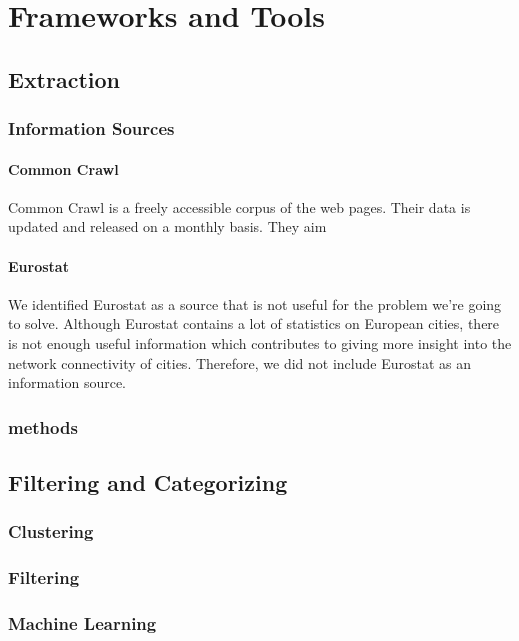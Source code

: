\section{Frameworks and Tools}

\subsection{Extraction}
\subsubsection{Information Sources}

\paragraph{Common Crawl}
Common Crawl \cite{commoncrawl} is a freely accessible corpus of the web pages. Their data is updated and released on a monthly basis. They aim 

\paragraph{Eurostat}
We identified Eurostat as a source that is not useful for the problem we're going to solve. Although Eurostat contains a lot of statistics on European cities, there is not enough useful information which contributes to giving more insight into the network connectivity of cities. Therefore, we did not include Eurostat as an information source.
\subsubsection{methods}

\subsection{Filtering and Categorizing}

\subsubsection{Clustering}
\subsubsection{Filtering}
\subsubsection{Machine Learning}

